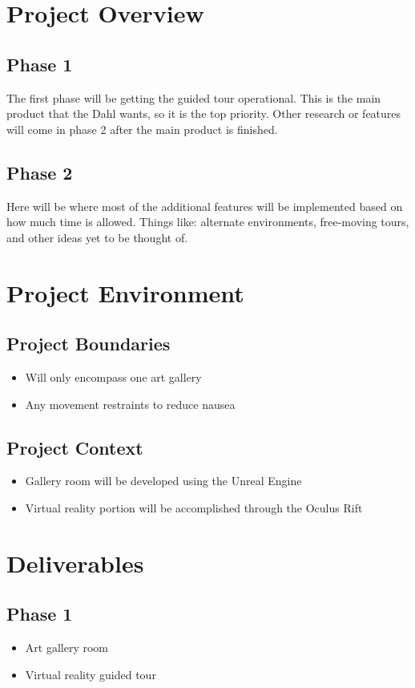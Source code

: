 \documentclass[11pt]{book}
\begin{document}
\section*{Project Overview}
\hrulefill
\subsection*{Phase 1}
The first phase will be getting the guided tour operational.  This is the main product that the Dahl wants, so it is the top priority.  Other research or features will come in phase 2 after the main product is finished.

\subsection*{Phase 2}
Here will be where most of the additional features will be implemented based on how much time is allowed.  Things like: alternate environments, free-moving tours, and other ideas yet to be thought of.

\section*{Project Environment}
\hrulefill
\subsection*{Project Boundaries}
\begin{itemize}
\item Will only encompass one art gallery
\item Any movement restraints to reduce nausea
\end{itemize}

\subsection*{Project Context}
\begin{itemize}
\item Gallery room will be developed using the Unreal Engine
\item Virtual reality portion will be accomplished through the Oculus Rift
\end{itemize}

\section*{Deliverables}
\hrulefill
\subsection*{Phase 1}
\begin{itemize}
\item Art gallery room 
\item Virtual reality guided tour
\end{itemize}
\end{document}
